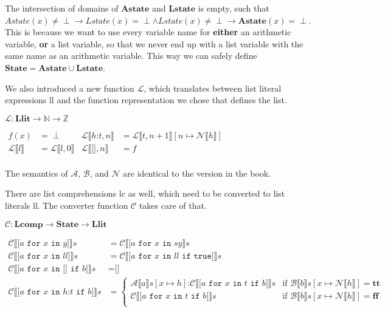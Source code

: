 \documentclass[12pt]{article}
\newcommand\mono\texttt
\newcommand{\metavar}[1]{\textlangle#1\textrangle}
\newcommand{\dblbr}[1]{\llbracket#1\rrbracket}
\newcommand{\fancybr}[2]{#1 \dblbr{#2}}
\renewcommand{\AA}{\mathcal{A}}
\newcommand{\BB}{\mathcal{B}}
\newcommand{\CC}{\mathcal{C}}
\newcommand{\LL}{\mathcal{L}}
\newcommand{\NN}{\mathcal{N}}
\newcommand{\State}{\mathbf{State}}
\newcommand{\Astate}{\mathbf{Astate}}
\newcommand{\Lstate}{\mathbf{Lstate}}
\newcommand{\Llit}{\mathbf{Llit}}
\newcommand{\Lcomp}{\mathbf{Lcomp}}
\begin{document}
The intersection of domains of $\Astate$ and $\Lstate$ is empty, such that $Astate(x) \neq \perp \rightarrow Lstate(x) = \perp \land Lstate(x) \neq \perp \rightarrow \Astate(x) = \perp$. This is because we want to use every variable name for \textbf{either} an arithmetic variable, \textbf{or} a list variable, so that we never end up with a list variable with the same name as an arithmetic variable. This way we can safely define $\State = \Astate \cup \Lstate$.

We also introduced a new function $\LL$, which translates between list literal expressions \metavar{ll} and the function representation we chose that defines the list.

$\LL: \Llit \rightarrow \mathbb{N} \rightarrow \mathbb{Z}$

$\begin{aligned}
    f(x) &= \perp & \fancybr{\LL}{h \mono{:} t, n} &= \fancybr{\LL}{t, n + 1}[n \mapsto \fancybr{\NN}{h}]\\
    \fancybr{\LL}{l} &= \fancybr{\LL}{l, 0} & \fancybr{\LL}{\mono{[]}, n} &= f\\
\end{aligned}$

The semantics of $\AA$, $\BB$, and $\NN$ are identical to the version in the book.

There are list comprehensions \metavar{lc} as well, which need to be converted to list literals \metavar{ll}. The converter function $\CC$ takes care of that.

$\CC: \Lcomp \rightarrow \State \rightarrow \Llit$

$\begin{aligned}
    \fancybr{\CC}{\mono{[} a \mono{ for } x \mono{ in } y\mono{]}} s &= \fancybr{\CC}{\mono{[} a \mono{ for } x \mono{ in } s y} s\\
    \fancybr{\CC}{\mono{[} a \mono{ for } x \mono{ in } ll \mono{]}} s &= \fancybr{\CC}{\mono{[} a \mono{ for } x \mono{ in } ll \mono{ if true]}} s\\
    \fancybr{\CC}{\mono{[} a \mono{ for } x \mono{ in [] if } b \mono{]}} s &= \mono{[]}\\
    \fancybr{\CC}{\mono{[} a \mono{ for } x \mono{ in } h \mono{:} t \mono{ if } b \mono{]}} s &= \begin{cases}
        \fancybr{\AA}{a} s[x \mapsto h] \mono{:} \fancybr{\CC}{\mono{[} a \mono{ for } x \mono{ in } t \mono{ if } b\mono{]}} s
        & \text{if } \fancybr{\BB}{b} s[x \mapsto \fancybr{\NN}{h}] = \mathbf{tt}\\
        \fancybr{\CC}{\mono{[} a \mono{ for } x \mono{ in } t \mono{ if } b \mono{]}} s
        & \text{if } \fancybr{\BB}{b} s[x \mapsto \fancybr{\NN}{h}] = \mathbf{ff}\\
    \end{cases}\\
\end{aligned}$
\end{document}
